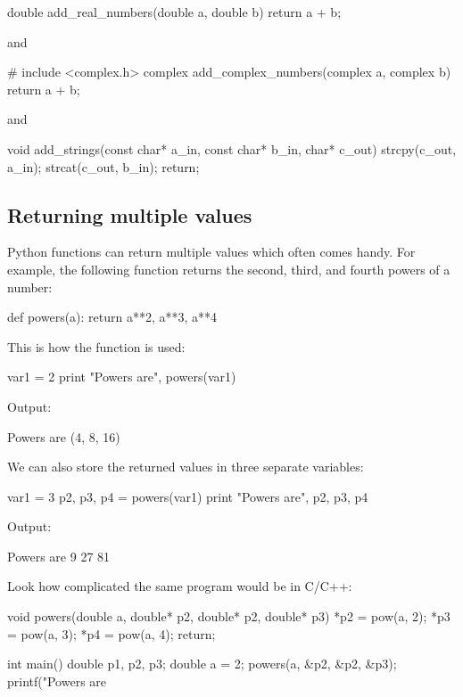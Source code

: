 \begin{bluecode}
double add_real_numbers(double a, double b)
{
  return a + b;
}
\end{bluecode}
and

\begin{bluecode}
# include <complex.h>
complex add_complex_numbers(complex a, complex b)
{
  return a + b;
}
\end{bluecode}
and 

\begin{bluecode}
void add_strings(const char* a_in, const char* b_in, char* c_out)
{
  strcpy(c_out, a_in);
  strcat(c_out, b_in);
  return;
}
\end{bluecode}

\subsection{Returning multiple values}

Python functions can return multiple values which often comes handy.
For example, the following function returns the 
second, third, and fourth powers of a number:

\begin{bluecode}
def powers(a):
    return a**2, a**3, a**4
\end{bluecode}
This is how the function is used:

\begin{bluecode}
var1 = 2
print "Powers are", powers(var1)
\end{bluecode}
Output:

\begin{bluecode}
Powers are (4, 8, 16)
\end{bluecode}
We can also store the returned values in three separate variables:

\begin{bluecode}
var1 = 3
p2, p3, p4 = powers(var1)
print "Powers are", p2, p3, p4
\end{bluecode}
Output:

\begin{bluecode}
Powers are 9 27 81
\end{bluecode}
Look how complicated the same program would be in C/C++:

\begin{bluecode}
void powers(double a, double* p2, double* p2, double* p3)
{
  *p2 = pow(a, 2);
  *p3 = pow(a, 3);
  *p4 = pow(a, 4);
  return;
}

int main()
{
  double p1, p2, p3;
  double a = 2;
  powers(a, &p2, &p2, &p3);
  printf("Powers are %
}
\end{bluecode}

